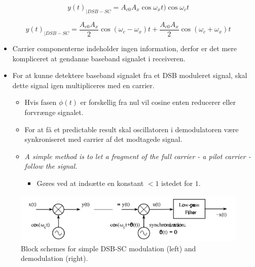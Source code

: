 \begin{equation}\label{eq:DSB_spectral1}
y(t)_{|DSB-SC} = A_{c0} A_x \cos \omega_x t) \cos \omega_c t
\end{equation}

\begin{equation}\label{eq:DSB_spectral2}
y(t)_{|DSB-SC}  = \dfrac{A_{c0}A_x}{2} \cos(\omega_c-\omega_x) t + \dfrac{A_{c0}A_x}{2} \cos(\omega_c+\omega_x) t
\end{equation}

\begin{itemize}
	\item Carrier componenterne indeholder ingen information, derfor er det mere kompliceret at gendanne baseband signalet i receiveren.
	\item For at kunne detektere baseband signalet fra et DSB moduleret
	signal, skal dette signal igen multipliceres med en carrier.
	\begin{itemize}
		\item  Hvis fasen $\phi(t)$ er forskellig fra nul vil
		cosine enten reducerer eller forvrænge signalet.
		\item For at få et predictable result skal oscillatoren i demodulatoren være  synkroniseret med carrier af det modtagede signal. 
		\item \textit{A simple method is to let a fragment of the full carrier - a pilot carrier - follow the signal.}
		\begin{itemize}
			\item Gøres ved at indsætte en konstant $<1$ istedet for $1$.
		\end{itemize}
	\end{itemize}
\end{itemize}

\begin{figure} [H]
	\centering
	\includegraphics[width=\linewidth]{graphics/7.png}
	\caption{ Block schemes for simple DSB-SC modulation (left) and demodulation (right).}
	\label{fig:7}
\end{figure}
